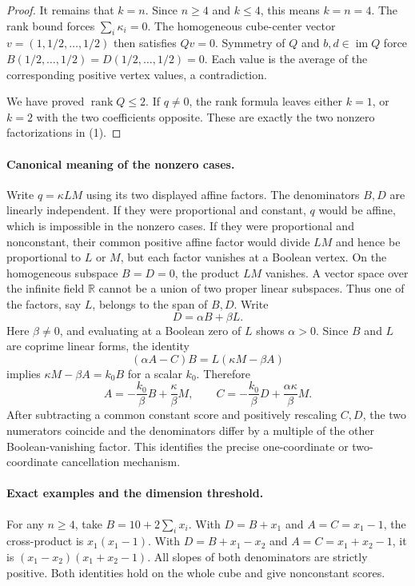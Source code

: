 \documentclass[11pt]{article}
\begin{document}
\begin{proof}
It remains that $k=n$. Since $n\geq4$ and $k\leq4$, this means
$k=n=4$. The rank bound forces $\sum_i\kappa_i=0$. The homogeneous
cube-center vector $v=(1,1/2,\ldots,1/2)$ then satisfies $Qv=0$.
Symmetry of $Q$ and $b,d\in\operatorname{im}Q$ force
$B(1/2,\ldots,1/2)=D(1/2,\ldots,1/2)=0$. Each value is the average
of the corresponding positive vertex values, a contradiction.

We have proved $\operatorname{rank}Q\leq2$. If $q\neq0$, the rank
formula leaves either $k=1$, or $k=2$ with the two coefficients
opposite. These are exactly the two nonzero factorizations in (1).
\end{proof}

\paragraph{Canonical meaning of the nonzero cases.}
Write $q=\kappa LM$ using its two displayed affine factors.
The denominators $B,D$ are linearly independent. If they were
proportional and constant, $q$ would be affine, which is impossible
in the nonzero cases. If they were proportional and nonconstant,
their common positive affine factor would divide $LM$ and hence
be proportional to $L$ or $M$, but each factor vanishes at a Boolean
vertex.
On the homogeneous subspace $B=D=0$, the product $LM$ vanishes.
A vector space over the infinite field $\mathbb R$ cannot be a union
of two proper linear subspaces. Thus one of the factors, say $L$,
belongs to the span of $B,D$. Write
\[
 D=\alpha B+\beta L.
\]
Here $\beta\neq0$, and evaluating at a Boolean zero of $L$ shows
$\alpha>0$. Since $B$ and $L$ are coprime linear forms, the identity
\[
 (\alpha A-C)B=L(\kappa M-\beta A)
\]
implies $\kappa M-\beta A=k_0B$ for a scalar $k_0$. Therefore
\[
 A=-\frac{k_0}{\beta}B+\frac\kappa\beta M,
 \qquad
 C=-\frac{k_0}{\beta}D+\frac{\alpha\kappa}{\beta}M.
\]
After subtracting a common constant score and positively rescaling
$C,D$, the two numerators coincide and the denominators differ by a
multiple of the other Boolean-vanishing factor. This identifies the
precise one-coordinate or two-coordinate cancellation mechanism.

\paragraph{Exact examples and the dimension threshold.}
For any $n\geq4$, take $B=10+2\sum_i x_i$.
With $D=B+x_1$ and $A=C=x_1-1$, the cross-product is
$x_1(x_1-1)$. With $D=B+x_1-x_2$ and $A=C=x_1+x_2-1$, it is
$(x_1-x_2)(x_1+x_2-1)$. All slopes of both denominators are strictly positive.
Both identities hold on the whole cube and give nonconstant scores.
\end{document}
